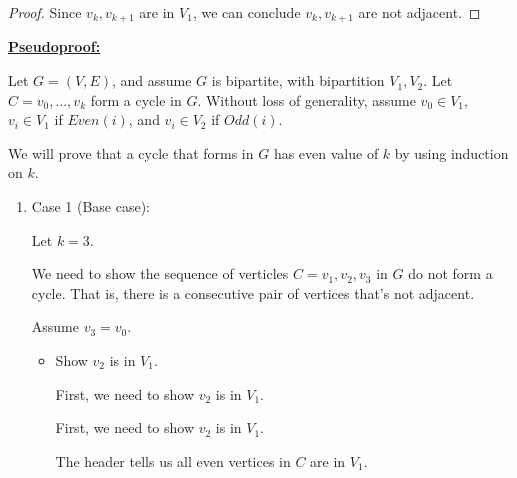 \documentclass[12pt]{article}
\begin{document}
\begin{enumerate}[a.]
\begin{proof}
        \bigskip

        Since $v_k,v_{k+1}$ are in $V_1$, we can conclude $v_k,v_{k+1}$ are not
        adjacent.

    \end{proof}

    \bigskip

    \begin{mdframed}
        \underline{\textbf{Pseudoproof:}}

        \bigskip

        Let $G = (V,E)$, and assume $G$ is bipartite, with bipartition $V_1,V_2$.
        Let $C = v_0,...,v_k$ form a cycle in $G$. Without loss of generality,
        assume $v_0 \in V_1$, $v_i \in V_1$ if $Even(i)$, and $v_i \in V_2$ if $Odd(i)$.

        \bigskip

        We will prove that a cycle that forms in $G$ has even value of $k$ by using induction on $k$.

        \bigskip

        \begin{enumerate}[1.]
            \item Case 1 (Base case):

            \bigskip

            Let $k = 3$.

            \bigskip

            We need to show the sequence of verticles $C=v_1,v_2,v_3$ in $G$ do not
            form a cycle. That is, there is a consecutive pair of vertices that's not
            adjacent.

            \bigskip

            Assume $v_3 = v_0$.

            \bigskip

            \begin{itemize}
                \item Show $v_2$ is in $V_1$.

                \bigskip

                First, we need to show $v_2$ is in $V_1$.

                \begin{mdframed}
                First, we need to show $v_2$ is in $V_1$.

                \bigskip

                The header tells us all even vertices in $C$ are in $V_1$.


\end{mdframed}
\end{itemize}
\end{enumerate}
\end{mdframed}
\end{enumerate}
\end{document}

